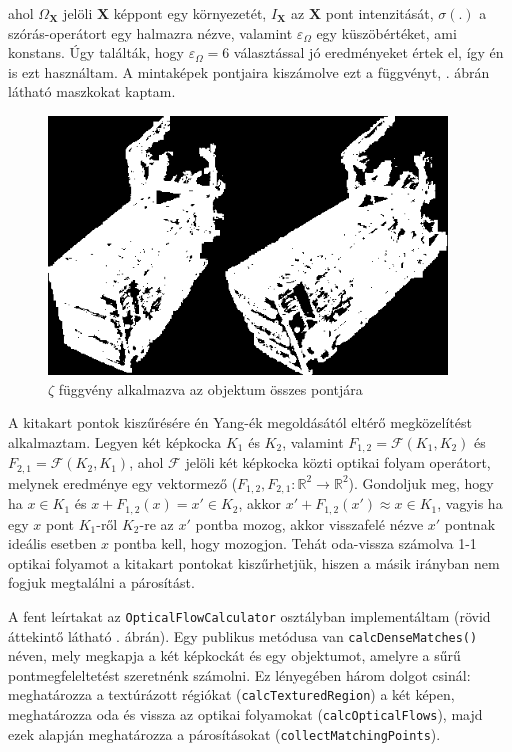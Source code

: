 ahol $\Omega_\mathbf{X}$ jelöli $\mathbf{X}$ képpont egy környezetét, $I_\mathbf{X}$ az $\mathbf{X}$ pont intenzitását, $\sigma(.)$ a szórás-operátort egy halmazra nézve, valamint $\varepsilon_\Omega$ egy küszöbértéket, ami konstans. Úgy találták, hogy $\varepsilon_\Omega = 6$ választással jó eredményeket értek el, így én is ezt használtam. A mintaképek pontjaira kiszámolve ezt a függvényt, . ábrán látható maszkokat kaptam.

\begin{figure}[tbh]
\centering
\includegraphics[width=300pt]{figures/textures.png}
\caption{$\zeta$ függvény alkalmazva az objektum összes pontjára \label{fig:textures}}
\end{figure}

{\color{red}A kitakart pontok kiszűrésére én Yang-ék megoldásától \cite{optical-flow-rectification} eltérő megközelítést alkalmaztam.} Legyen két képkocka $K_1$ és $K_2$, valamint $F_{1, 2} = \mathcal{F}(K_1, K_2)$ és $F_{2, 1} = \mathcal{F}(K_2, K_1)$, ahol $\mathcal{F}$ jelöli két képkocka közti optikai folyam operátort, melynek eredménye egy vektormező ($F_{1, 2}, F_{2, 1} : \mathbb{R}^2 \rightarrow \mathbb{R}^2$). Gondoljuk meg, hogy ha $x\in K_1$ és $x + F_{1,2}(x) = x' \in K_2$, akkor $x' + F_{1,2}(x') \approx x \in K_1$, vagyis ha egy $x$ pont $K_1$-ről $K_2$-re az $x'$ pontba mozog, akkor visszafelé nézve $x'$ pontnak ideális esetben $x$ pontba kell, hogy mozogjon. Tehát oda-vissza számolva 1-1 optikai folyamot a kitakart pontokat kiszűrhetjük, hiszen a másik irányban nem fogjuk megtalálni a párosítást.

A fent leírtakat az \texttt{OpticalFlowCalculator} osztályban implementáltam (rövid áttekintő látható . ábrán). Egy publikus metódusa van \texttt{calcDenseMatches()} néven, mely megkapja a két képkockát és egy objektumot, amelyre a sűrű pontmegfeleltetést szeretnénk számolni. Ez lényegében három dolgot csinál: meghatározza a textúrázott régiókat (\texttt{calcTexturedRegion}) a két képen, meghatározza oda és vissza az optikai folyamokat (\texttt{calcOpticalFlows}), majd ezek alapján meghatározza a párosításokat (\texttt{collectMatchingPoints}).

